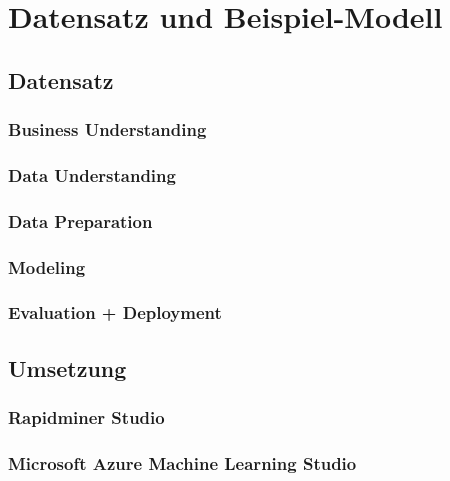 %


%
%
\chapter{Datensatz und Beispiel-Modell}
\label{sec:example}

\section{Datensatz}
\label{sec:example:data}

\subsection{Business Understanding}
\label{sec:example:data:bu}

\subsection{Data Understanding}
\label{sec:example:data:du}

\subsection{Data Preparation}
\label{sec:example:data:dp}

\subsection{Modeling}
\label{sec:example:data:mod}

\subsection{Evaluation + Deployment}
\label{sec:example:data:eval}

\section{Umsetzung}
\label{sec:example:impl}

\subsection{Rapidminer Studio}
\label{sec:example:impl:rm}

\subsection{Microsoft Azure Machine Learning Studio}
\label{sec:example:impl:msa}
